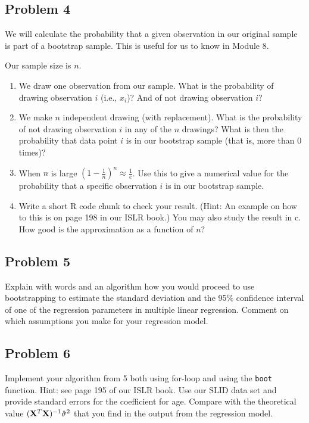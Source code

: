 \documentclass[]{article}
\providecommand{\tightlist}{%
  \setlength{\itemsep}{0pt}\setlength{\parskip}{0pt}}
\begin{document}
\hypertarget{problem-4}{%
\subsection{Problem 4}\label{problem-4}}

We will calculate the probability that a given observation in our
original sample is part of a bootstrap sample. This is useful for us to
know in Module 8.

Our sample size is \(n\).

\begin{enumerate}
\def\labelenumi{\alph{enumi}.}
\tightlist
\item
  We draw one observation from our sample. What is the probability of
  drawing observation \(i\) (i.e., \(x_i\))? And of not drawing
  observation \(i\)?
\item
  We make \(n\) independent drawing (with replacement). What is the
  probability of not drawing observation \(i\) in any of the \(n\)
  drawings? What is then the probability that data point \(i\) is in our
  bootstrap sample (that is, more than 0 times)?
\item
  When \(n\) is large \((1-\frac{1}{n})^n \approx \frac{1}{e}\). Use
  this to give a numerical value for the probability that a specific
  observation \(i\) is in our bootstrap sample.
\item
  Write a short R code chunk to check your result. (Hint: An example on
  how to this is on page 198 in our ISLR book.) You may also study the
  result in c. How good is the approximation as a function of \(n\)?
\end{enumerate}

\hypertarget{problem-5}{%
\subsection{Problem 5}\label{problem-5}}

Explain with words and an algorithm how you would proceed to use
bootstrapping to estimate the standard deviation and the 95\% confidence
interval of one of the regression parameters in multiple linear
regression. Comment on which assumptions you make for your regression
model.

\hypertarget{problem-6}{%
\subsection{Problem 6}\label{problem-6}}

Implement your algorithm from 5 both using for-loop and using the
\texttt{boot} function. Hint: see page 195 of our ISLR book. Use our
SLID data set and provide standard errors for the coefficient for age.
Compare with the theoretical value
\(({\bf X}^T{\bf X})^{-1}\hat{\sigma}^2\) that you find in the output
from the regression model.
\end{document}

